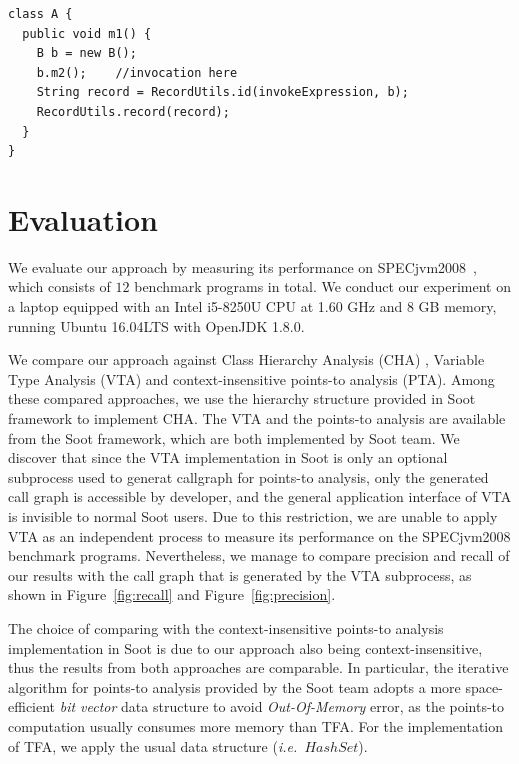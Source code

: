 \documentclass{fac}
\newcommand\ie{\textit{i.e.\ }}
\begin{document}
\begin{minipage}{\linewidth}
\vspace{10pt}
\begin{lstlisting}[caption={Example code after instrumentation},label={lst:after-instru}]
class A {
  public void m1() {
    B b = new B();
    b.m2();    //invocation here
    String record = RecordUtils.id(invokeExpression, b);
    RecordUtils.record(record);
  }
}
\end{lstlisting}
\end{minipage}

\section{Evaluation}\label{sec:evaluation}
We evaluate our approach by measuring its performance on SPECjvm2008~\cite{specjvm}, which consists of $12$ benchmark programs in total. We conduct our experiment on a laptop equipped with an Intel i5-8250U CPU at 1.60 GHz and 8 GB memory, running Ubuntu 16.04LTS with OpenJDK 1.8.0.

We compare our approach against Class Hierarchy Analysis (CHA) , Variable Type Analysis (VTA) and context-insensitive points-to analysis (PTA). Among these compared approaches, we use the hierarchy structure provided in Soot framework to implement CHA. The VTA and the points-to analysis are available from the Soot framework, which are both implemented by Soot team. We discover that since the VTA implementation in Soot is only an optional subprocess used to generat callgraph for points-to analysis, only the generated call graph is accessible by developer, and the general application interface of VTA is invisible to normal Soot users. Due to this restriction, we are unable to apply VTA as an independent process to measure its performance on the SPECjvm2008 benchmark programs. Nevertheless, we manage to compare precision and recall of our results with the call graph that is generated by the VTA subprocess, as shown in Figure~\ref{fig:recall} and Figure~\ref{fig:precision}.

The choice of comparing with the context-insensitive points-to analysis implementation in Soot is due to our approach also being context-insensitive, thus the results from both approaches are comparable. In particular, the iterative algorithm for points-to analysis %
provided by the Soot team adopts a more space-efficient \emph{bit vector} data structure to avoid \emph{Out-Of-Memory} error, 
as the points-to computation usually consumes more memory than TFA. For the implementation of TFA, we apply the usual data structure (\ie $HashSet$).
%
\end{document}
